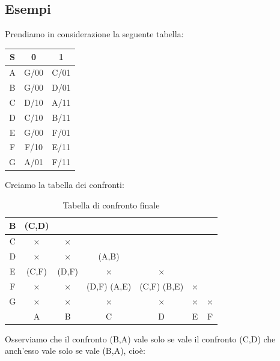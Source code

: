 \documentclass[a4paper]{article}
\theoremstyle{break}
\theoremstyle{break}
\theoremstyle{break}
\theoremstyle{break}
\begin{document}
\subsection{Esempi}
  \begin{example}
    Prendiamo in considerazione la seguente tabella:
    \begin{table}[H]
      \begin{center}
        \begin{tabular}{c|c|c}
          S & 0 & 1 \\
          \hline
          A & G/00 & C/01 \\
          B & G/00 & D/01 \\
          C & D/10 & A/11 \\
          D & C/10 & B/11 \\
          E & G/00 & F/01 \\
          F & F/10 & E/11 \\
          G & A/01 & F/11 \\
        \end{tabular}
      \end{center}
    \end{table}
    Creiamo la tabella dei confronti:
    \begin{table}[H]
  \begin{center}
    \begin{tabular}{c|c|c|c|c|c|c}
      B & (C,D) &  &  &  &  & \\
      \hline
      C & \( \times  \)  & \( \times \)  &  &  &  &  \\
      \hline
      D & \( \times  \)  & \( \times  \)  & (A,B) &  &  &  \\
      \hline
      E & (C,F) & (D,F) & \( \times \)  & \( \times  \) &  &   \\
      \hline
      F & \( \times  \)  & \( \times  \)  & (D,F) (A,E)  & (C,F) (B,E) & \( \times  \)  & \\
      \hline
      G & \( \times  \)  & \( \times  \)  & \( \times  \)  & \( \times  \) & \( \times  \)  & \( \times  \)  \\
      \hline
        & A & B & C & D & E & F \\
    \end{tabular}
  \end{center}
  \caption{Tabella di confronto finale}
\end{table}
    Osserviamo che il confronto (B,A) vale solo se vale il confronto (C,D) che anch'esso
    vale solo se vale (B,A), cioè:
    \[
\]
\end{example}
\end{document}
